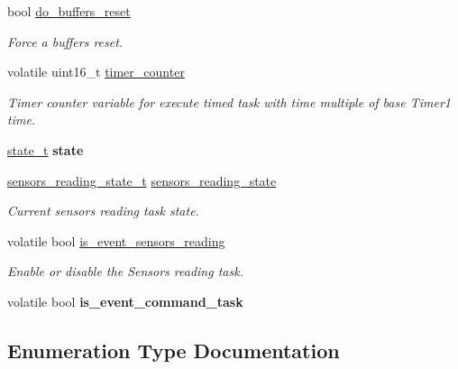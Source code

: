 \begin{DoxyCompactItemize}
\mbox{\label{i2c-th_8h_a52a9c0540faee23b8ff875f320290dea}} 
bool \hyperlink{i2c-th_8h_a52a9c0540faee23b8ff875f320290dea}{do\+\_\+buffers\+\_\+reset}
\begin{DoxyCompactList}\small\item\em Force a buffers reset. \end{DoxyCompactList}\item 
\mbox{\label{i2c-th_8h_afb83826ad15c7d630e9798a9b4055316}} 
volatile uint16\+\_\+t \hyperlink{i2c-th_8h_afb83826ad15c7d630e9798a9b4055316}{timer\+\_\+counter}
\begin{DoxyCompactList}\small\item\em Timer counter variable for execute timed task with time multiple of base Timer1 time. \end{DoxyCompactList}\item 
\mbox{\label{i2c-th_8h_a499e7824037af983d0524a98081e7f0b}} 
\hyperlink{i2c-rain_8h_aa0aafed44fec19806d8f9ad834be1248}{state\+\_\+t} {\bfseries state}
\item 
\hyperlink{i2c-th_8h_a48bef3d022ff6f88967496ad53a6b953}{sensors\+\_\+reading\+\_\+state\+\_\+t} \hyperlink{i2c-th_8h_a2ad2494d7aa3d5924b49127e1acefe40}{sensors\+\_\+reading\+\_\+state}
\begin{DoxyCompactList}\small\item\em Current sensors reading task state. \end{DoxyCompactList}\item 
\mbox{\label{i2c-th_8h_a023cce184c1d76f85eea707461e61e0c}} 
volatile bool \hyperlink{i2c-th_8h_a023cce184c1d76f85eea707461e61e0c}{is\+\_\+event\+\_\+sensors\+\_\+reading}
\begin{DoxyCompactList}\small\item\em Enable or disable the Sensors reading task. \end{DoxyCompactList}\item 
\mbox{\label{i2c-th_8h_adb3fea2ed1729cd6ff65da92da27c048}} 
volatile bool {\bfseries is\+\_\+event\+\_\+command\+\_\+task}
\end{DoxyCompactItemize}


\subsection{Enumeration Type Documentation}
\mbox{\label{i2c-th_8h_a48bef3d022ff6f88967496ad53a6b953}} 
